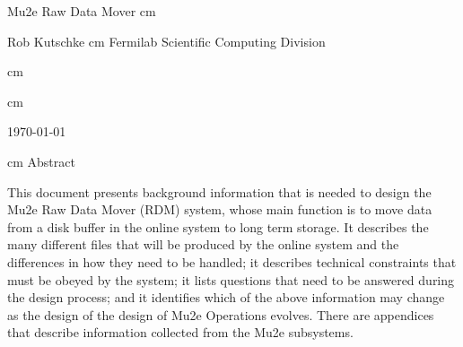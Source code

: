 %
\begin{center}
  {\Huge Mu2e Raw Data Mover}
   cm

  Rob Kutschke
 cm
Fermilab Scientific Computing Division

 cm


%

%

 cm

\today

 cm
Abstract
\end{center}
\medskip

This document presents background information
that is needed to design the Mu2e Raw Data Mover (RDM) system,
whose main function is to move data from a disk buffer
in the online system to long term storage.
It describes the many different files that will be produced by the online system
and the differences in how they need to be handled;
it describes technical constraints that must be obeyed by the system;
it lists questions that need to be answered during the design process;
and it identifies which of the above information may change as the
design of the design of Mu2e Operations evolves.
There are appendices
that describe information collected from the Mu2e subsystems.
\clearpage
